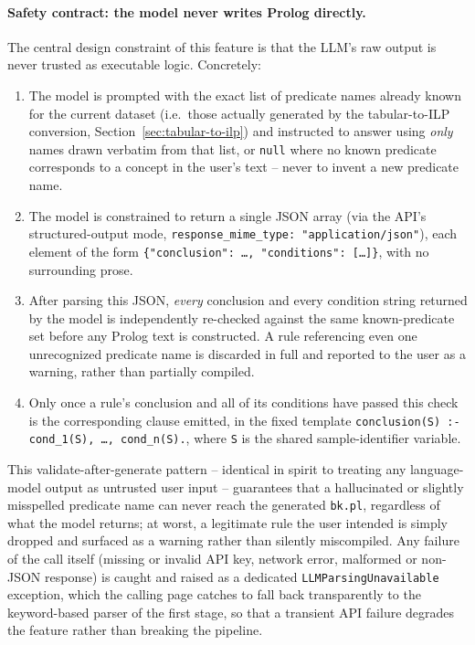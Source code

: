 \paragraph{Safety contract: the model never writes Prolog directly.}
The central design constraint of this feature is that the LLM's raw
output is never trusted as executable logic. Concretely:
\begin{enumerate}
\item The model is prompted with the exact list of predicate names
already known for the current dataset (i.e.\ those actually generated
by the tabular-to-ILP conversion, Section~\ref{sec:tabular-to-ilp}) and
instructed to answer using \emph{only} names drawn verbatim from that
list, or \texttt{null} where no known predicate corresponds to a
concept in the user's text -- never to invent a new predicate name.
\item The model is constrained to return a single JSON array (via the
API's structured-output mode, \texttt{response\_mime\_type:
"application/json"}), each element of the form
\texttt{\{"conclusion": \ldots, "conditions": [\ldots]\}}, with no
surrounding prose.
\item After parsing this JSON, \emph{every} conclusion and every
condition string returned by the model is independently re-checked
against the same known-predicate set before any Prolog text is
constructed. A rule referencing even one unrecognized predicate name
is discarded in full and reported to the user as a warning, rather
than partially compiled.
\item Only once a rule's conclusion and all of its conditions have
passed this check is the corresponding clause emitted, in the fixed
template \texttt{conclusion(S) :- cond\_1(S), \ldots, cond\_n(S).},
where \texttt{S} is the shared sample-identifier variable.
\end{enumerate}
This validate-after-generate pattern -- identical in spirit to
treating any language-model output as untrusted user input --
guarantees that a hallucinated or slightly misspelled predicate name
can never reach the generated \texttt{bk.pl}, regardless of what the
model returns; at worst, a legitimate rule the user intended is simply
dropped and surfaced as a warning rather than silently miscompiled.
Any failure of the call itself (missing or invalid API key, network
error, malformed or non-JSON response) is caught and raised as a
dedicated \texttt{LLMParsingUnavailable} exception, which the calling
page catches to fall back transparently to the keyword-based parser
of the first stage, so that a transient API failure degrades the
feature rather than breaking the pipeline.

